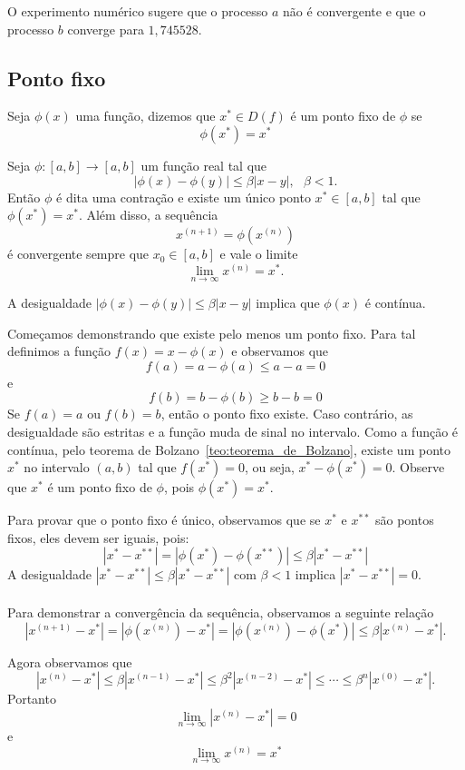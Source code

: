 O experimento numérico sugere que o processo $a$ não é convergente e que o processo $b$ converge para $1,745528$.

\subsection{Ponto fixo}

Seja $\phi (x)$ uma função, dizemos que $x^*\in D(f)$ é um ponto fixo de $\phi$ se
$$\phi(x^*)=x^*$$

Seja $\phi:[a,b]\to [a,b]$ um função real tal que
$$|\phi(x)-\phi(y)|\leq \beta |x-y|,~~~\beta<1.$$
Então $\phi$ é dita uma contração e existe um único ponto $x^*\in [a,b]$ tal que $\phi(x^*)=x^*$. Além disso, a sequência
$$x^{(n+1)}=\phi(x^{(n)})$$
é convergente sempre que $x_0\in[a,b]$ e vale o limite $$\lim_{n\to\infty}x^{(n)}=x^*.$$

\begin{obs}
A desigualdade $|\phi(x)-\phi(y)|\leq \beta |x-y|$ implica que $\phi(x)$ é contínua.  
\end{obs}

Começamos demonstrando que existe pelo menos um ponto fixo. Para tal definimos a função $f(x)=x-\phi(x)$ e observamos que
$$f(a)=a-\phi(a)\leq a-a=0$$
e
$$f(b)=b-\phi(b)\geq b-b=0$$
Se $f(a)=a$ ou $f(b)=b$, então o ponto fixo existe. Caso contrário, as desigualdade são estritas e a função muda de sinal no intervalo. Como a função é contínua, pelo teorema de Bolzano~\ref{teo:teorema_de_Bolzano}, existe um ponto $x^*$ no intervalo $(a, b)$ tal que $f(x^*)=0$, ou seja, $x^*-\phi(x^*)=0$. Observe que $x^*$ é um ponto fixo de $\phi$, pois $\phi(x^*)=x^*$. 

Para provar que o ponto fixo é único, observamos que se $x^*$ e $x^{**}$ são pontos fixos, eles devem ser iguais, pois:
$$|x^*-x^{**}|=|\phi(x^{*})-\phi(x^{**})|\leq \beta |x^*-x^{**}|$$
A desigualdade $|x^*-x^{**}|\leq \beta |x^*-x^{**}|$ com $\beta<1$ implica $|x^*-x^{**}|=0$.
\\~\\

Para demonstrar a convergência da sequência, observamos a seguinte relação
$$|x^{(n+1)}-x^*|=|\phi(x^{(n)})-x^*|=|\phi(x^{(n)})-\phi(x^*)|\leq \beta |x^{(n)}-x^*|.$$

Agora observamos que
$$|x^{(n)}-x^*|\leq  \beta |x^{(n-1)}-x^*|\leq \beta^2 |x^{(n-2)}-x^*|\leq \cdots \leq \beta^{n}|x^{(0)}-x^*|.$$
Portanto
$$\lim_{n\to\infty}|x^{(n)}-x^*|=0$$
e
$$\lim_{n\to\infty}x^{(n)}=x^*$$

